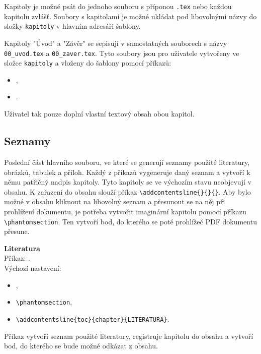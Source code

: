 Kapitoly je možné psát do jednoho souboru s příponou \verb|.tex| nebo každou kapitolu zvlášť. Soubory s kapitolami je možné ukládat pod libovolnými názvy do složky \verb|kapitoly| v hlavním adresáři šablony.

Kapitoly "Úvod" a "Závěr" se sepisují v samostatných souborech s názvy \verb|00_uvod.tex| a \verb|00_zaver.tex|. Tyto soubory jsou pro uživatele vytvořeny ve složce \verb|kapitoly| a vloženy do šablony pomocí příkazů:

\begin{itemize}[label={-}]
	\item \verb||,
	\item \verb||.
\end{itemize}

Uživatel tak pouze doplní vlastní textový obsah obou kapitol.





\subsection{Seznamy}
Poslední část hlavního souboru, ve které se generují seznamy použité literatury, obrázků, tabulek a příloh. Každý z příkazů vygeneruje daný seznam a vytvoří k němu patřičný nadpis kapitoly. Tyto kapitoly se ve výchozím stavu neobjevují v obsahu. K zařazení do obsahu slouží příkaz \verb|\addcontentsline{}{}{}|. Aby bylo možné v obsahu kliknout na libovolný seznam a přesunout se na něj při prohlížení dokumentu, je potřeba vytvořit imaginární kapitolu pomocí příkazu \verb|\phantomsection|. Ten vytvoří bod, do kterého se poté prohlížeč PDF dokumentu přesune.

\vspace{8pt}

\textbf{Literatura}\\
Příkaz: \verb||.\\
Výchozí nastavení:

\begin{itemize}[label={-}]
	\item \verb||,
	\item \verb|\phantomsection|,
	\item \verb|\addcontentsline{toc}{chapter}{LITERATURA}|.
\end{itemize}

Příkaz vytvoří seznam použité literatury, registruje kapitolu do obsahu a vytvoří bod, do kterého se bude možné odkázat z obsahu.

